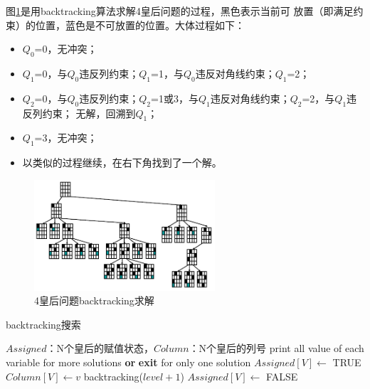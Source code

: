 \documentclass[10pt,letterpaper]{ctexart}
\newcommand{\figref}[1]{图\ref{#1}}
\begin{document}
\begin{enumerate}[itemindent=2em,label=\arabic*、]
    \par \qquad \figref{fig:4-queens}是用backtracking算法求解4皇后问题的过程，黑色表示当前可
    放置（即满足约束）的位置，蓝色是不可放置的位置。大体过程如下：
    \begin{itemize}[itemindent=2em]
      \item $Q_0$=0，无冲突；
      \item $Q_1$=0，与$Q_0$违反列约束；$Q_1$=1，与$Q_0$违反对角线约束；$Q_1$=2；
      \item $Q_2$=0，与$Q_0$违反列约束；$Q_2$=1或3，与$Q_1$违反对角线约束；$Q_2$=2，与$Q_1$违反列约束；
      无解，回溯到$Q_1$；
      \item $Q_1$=3，无冲突；
      \item 以类似的过程继续，在右下角找到了一个解。
    \end{itemize}

    \begin{figure}[H]
      \centering
      \includegraphics[width=0.6\textwidth]{4-queen.PNG}
      \caption{4皇后问题backtracking求解}
      \label{fig:4-queens}
    \end{figure}

    \begin{algorithm}
      \caption{backtracking搜索}
        \begin{algorithmic}[1] %
          \Require $Assigned$：N个皇后的赋值状态，$Column$：N个皇后的列号
                \State print all value of each variable
                \State \Return for more solutions \textbf{or} 
                \textbf{exit} for only one solution
              \Else
                \State $Assigned[V] \gets$ TRUE
                  \State $Column[V] \gets v$
                    \State backtracking($level + 1$)
                  \EndIf
                \EndFor
                \State $Assigned[V] \gets$ FALSE
                \State \Return
              \EndIf
            \EndFunction
        \end{algorithmic}
    \end{algorithm}
    

\end{enumerate}
\end{document}
